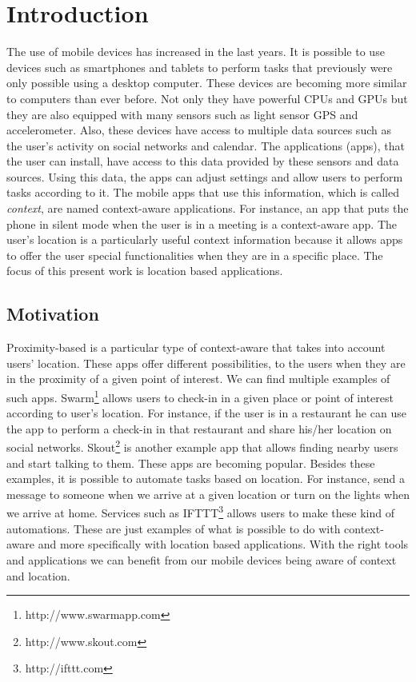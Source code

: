 
\chapter{Introduction}
\label{chapter:introduction}
The use of mobile devices has increased in the last years.
It is possible to use devices such as smartphones and tablets to perform tasks that previously were only possible using a desktop computer.
These devices are becoming more similar to computers than ever before.
Not only they have powerful \glspl{CPU} and \glspl{GPU} but they are also equipped with many sensors such as light sensor \gls{GPS} and accelerometer.
Also, these devices have access to multiple data sources such as
the user's activity on social networks and calendar.
The applications (apps), that the user can install, have access to this data provided by these sensors and data sources.
Using this data, the apps can adjust settings and allow users to perform tasks according to it.
The mobile apps that use this information, which is called \emph{context}, are named context-aware applications.
For instance, an app that puts the phone in silent mode when the user is in a meeting is a context-aware app.
The user's location is a particularly useful context information because it allows apps to offer the user special functionalities when they are in a specific place.
The focus of this present work is location based applications.

\section{Motivation}
\label{sec:introduction_motivation}
Proximity-based is a particular type of context-aware that takes into account users' location.
These apps offer different possibilities, to the users when they are in the proximity of a given point of interest.
We can find multiple examples of such apps.
Swarm\footnote{http://www.swarmapp.com} allows users to check-in in a given place or point of interest according to user's location.
For instance, if the user is in a restaurant he can use the app to perform a check-in in that restaurant and share his/her location on social networks.
Skout\footnote{http://www.skout.com}
is another example app that allows finding nearby users and start talking to them.
These apps are becoming popular.
Besides these examples, it is possible to automate tasks based on location.
For instance, send a message to someone when we arrive at a given location or turn on the lights when we arrive at home.
Services such as \gls{IFTTT}\footnote{http://ifttt.com} allows users to make these kind of automations.
These are just examples of what is possible to do with context-aware and more specifically with location based applications.
With the right tools and applications we can benefit from our mobile devices being aware of context and location.

